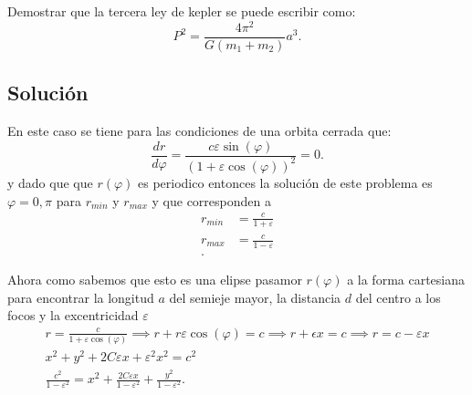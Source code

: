 \documentclass[12pt]{article}
\begin{document}
Demostrar que la tercera ley de kepler se puede escribir como: \[
P^2 = \frac{4\pi^2}{G\left( m_1 + m_2 \right) }a^{3}
.\] 

\subsection*{Solución}

En este caso se tiene para las condiciones de una orbita cerrada que: \[
\frac{dr}{d\varphi}=\frac{c\varepsilon\sin\left( \varphi \right) }{(1 + \varepsilon\cos\left( \varphi \right))^2 }=0
.\] y dado que que $r\left( \varphi \right) $ es periodico entonces la solución de este problema es $\varphi = 0, \pi$ para $r_{min}$ y $r_{max}$ y que corresponden a
\begin{align*}
  r_{min}&= \frac{c}{1+\varepsilon} \\
  r_{max}&= \frac{c}{1-\varepsilon} \\
.\end{align*}

Ahora como sabemos que esto es una elipse pasamor $r\left( \varphi \right) $ a la forma cartesiana para encontrar la longitud $a$ del semieje mayor, la distancia $d$ del centro a los focos y la excentricidad $\varepsilon$
\begin{align*}
  r = \frac{c}{1+\varepsilon\cos\left( \varphi \right) } \implies r + r\varepsilon\cos\left( \varphi \right)= c \implies r + \epsilon x = c \implies r = c - \varepsilon x \\
  x^2 + y^2 + 2C\varepsilon x + \varepsilon^2 x^2 = c^2\\
  \frac{c^2}{1-\varepsilon^2}=x^2 + \frac{2C\varepsilon x}{1 - \varepsilon^2} + \frac{y^2}{1-\varepsilon^2}
.\end{align*}
\end{document}
